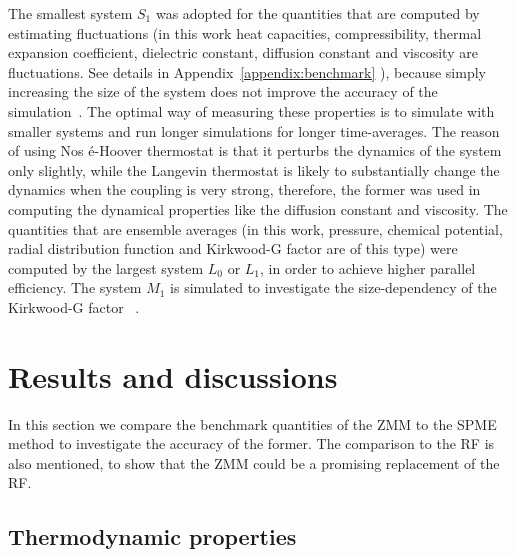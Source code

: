 \documentclass[a4paper,preprint,unsortedaddress,onecolumn,fleqn]{revtex4}
\begin{document}

The smallest system $S_{1}$ was adopted for the quantities that are computed
by estimating fluctuations (in this work heat capacities, compressibility,
thermal expansion coefficient, dielectric constant, diffusion constant and
viscosity are fluctuations. See details in Appendix~\ref{appendix:benchmark}%
), because simply increasing the size of the system does not improve the
accuracy of the simulation~\cite%
{milchev1986fluctuations,ferrenberg1991statistical}. The optimal way of
measuring these properties is to simulate with smaller systems 
and run longer simulations for longer time-averages. The reason of using Nos%
\'{e}-Hoover thermostat is that it perturbs the dynamics of the system only
slightly, while the Langevin thermostat is likely to substantially change
the dynamics when the coupling is very strong, therefore, the former was
used in computing the dynamical properties like the diffusion constant and
viscosity. The quantities that are ensemble averages (in this work,
pressure, chemical potential, radial distribution function and Kirkwood-G
factor are of this type) were computed by the largest system $L_{0}$ or $%
L_{1}$, in order to achieve higher parallel efficiency. The system $M_{1}$
is simulated to investigate the size-dependency of the Kirkwood-G factor~%
\cite{vanderSpoel2006origin}.

\section{Results and discussions}

In this section we compare the benchmark quantities of the ZMM to the SPME
method to investigate the accuracy of the former. The comparison to the RF
is also mentioned, to show that the ZMM could be a promising replacement of
the RF.

\subsection{Thermodynamic properties}
\end{document}
